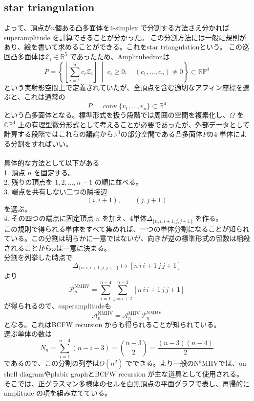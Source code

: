 \documentclass[uplatex,dvipdfmx,a4paper,11pt]{jsarticle}
\numberwithin{equation}{section}
\begin{document}
\subsection{star triangulation}
よって、頂点が$n$個ある凸多面体を4-simplex で分割する方法さえ分かればsuperamplitude を計算できることが分かった。
この分割方法には一般に規則があり、絵を書いて求めることができる。これをstar triangulationという。
この巡回凸多面体は$\mathcal Z_i\in\mathbb R^5$ であったため、Amplituhedronは
\[
P=
\left\{
\left[\sum_{i=1}^{n}c_i\mathcal Z_i\right]
\;\middle|\;
c_i\geq0,\quad(c_1,\ldots,c_n)\neq0
\right\}
\subset\mathbb{RP}^{4}
\]
という実射影空間上で定義されていたが、全頂点を含む適切なアフィン座標を選ぶと、これは通常の
\[
P=\operatorname{conv}\{v_1,\ldots,v_n\}
\subset\mathbb R^4
\]
という凸多面体となる。標準形式を扱う段階では周囲の空間を複素化し、\(\Omega\) を \(\mathbb{CP}^{4}\) 上の有理型微分形式として考えることが必要であったが、外部データとして計算する段階ではこれらの議論から$\mathbb{R}^4$の部分空間である凸多面体$P$の4-単体による分割をすればいい。\\\\
具体的な方法として以下がある\\
1. 頂点 \(n\) を固定する。\\
2. 残りの頂点を \(1,2,\ldots,n-1\) の順に並べる。\\
3. 端点を共有しない二つの隣接辺\[
   (i,i+1),\qquad(j,j+1)
   \]
   を選ぶ。\\
4. その四つの端点に固定頂点 \(n\) を加え、4単体$\Delta_{\{n,i,i+1,j,j+1\}}$
   を作る。\\
この規則で得られる単体をすべて集めれば、一つの単体分割になることが知られている。この分割は明らかに一意ではないが、向きが逆の標準形式の留数は相殺されることから$\omega$は一意に決まる。\\
分割を列挙した時点で
\[
\Delta_{\{n,i,i+1,j,j+1\}}
\longmapsto
[n\,i\,i+1\,j\,j+1]
\]
より
\[
\mathcal P_n^{\mathrm{NMHV}}
=
\sum_{i=1}^{n-4}
\sum_{j=i+2}^{n-2}
[n\,i\,i+1\,j\,j+1]
\]
が得られるので、superamplitudeも
\[
\boxed{
\mathcal A_n^{\mathrm{NMHV}}
=
\mathcal A_n^{\mathrm{MHV}}\,
\mathcal P_n^{\mathrm{NMHV}}
}
\]
となる。これはBCFW recursion からも得られることが知られている。\\
選ぶ単体の数は
\[
N_n
=
\sum_{i=1}^{n-4}(n-i-3)
=
\binom{n-3}{2}
=
\frac{(n-3)(n-4)}2
\]
であるので、この分割の列挙は\(O(n^2)\) でできる。より一般の\(\mathrm N^k\mathrm{MHV}\)では、on-shell diagramやplabic graphとBCFW recursion が主な道具として使用される。
そこでは、正グラスマン多様体のセルを白黒頂点の平面グラフで表し、再帰的にamplitude の項を組み立てている。\cite{LAM2026}
\end{document}
